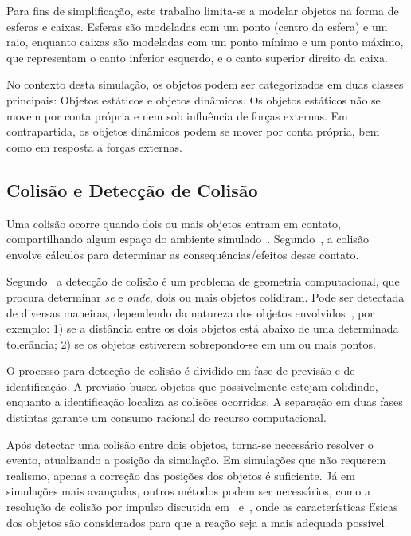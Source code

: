 \documentclass[12pt]{article}
\begin{document}
Para fins de simplificação, este trabalho limita-se a modelar objetos na forma de esferas e caixas. Esferas são modeladas com um ponto (centro da esfera) e um raio, enquanto caixas são modeladas com um ponto mínimo e um ponto máximo, que representam o canto inferior esquerdo, e o canto superior direito da caixa.

No contexto desta simulação, os objetos podem ser categorizados em duas classes principais: Objetos estáticos e objetos dinâmicos. Os objetos estáticos não se movem por conta própria e nem sob influência de forças externas. Em contrapartida, os objetos dinâmicos podem se mover por conta própria, bem como em resposta a forças externas.

\subsection{Colisão e Detecção de Colisão}

Uma colisão ocorre quando dois ou mais objetos entram em contato, compartilhando algum espaço do ambiente simulado~\cite{ericson2004real}. Segundo~\cite{bourg2013physics}, a colisão envolve cálculos para determinar as consequências/efeitos desse contato.

Segundo~\cite{bourg2013physics} a detecção de colisão é um problema de geometria computacional, que procura determinar \emph{se} e \emph{onde}, dois ou mais objetos colidiram. Pode ser detectada de diversas maneiras, dependendo da natureza dos objetos envolvidos~\cite{foley1996}, por exemplo: 1) se a distância entre os dois objetos está abaixo de uma determinada tolerância; 2) se os objetos estiverem sobrepondo-se em um ou mais pontos.

O processo para detecção de colisão é dividido em fase de previsão e de identificação. A previsão busca objetos que possivelmente estejam colidindo, enquanto a identificação localiza as colisões ocorridas. A separação em duas fases distintas garante um consumo racional do recurso computacional. 

Após detectar uma colisão entre dois objetos, torna-se necessário resolver o evento, atualizando a posição da simulação. Em simulações que não requerem realismo, apenas a correção das posições dos objetos é suficiente. Já em simulações mais avançadas, outros métodos podem ser necessários, como a resolução de colisão por impulso discutida em~\cite{bourg2013physics} e~\cite{baraff1992dynamic}, onde as características físicas dos objetos são considerados para que a reação seja a mais adequada possível.
\end{document}
